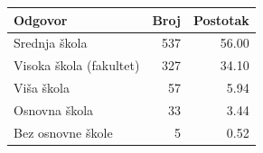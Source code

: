 \begin{tabular}{lrr}
\toprule
Odgovor & Broj & Postotak \\
\midrule
Srednja škola & 537 & 56.00 \\
Visoka škola (fakultet) & 327 & 34.10 \\
Viša škola & 57 & 5.94 \\
Osnovna škola & 33 & 3.44 \\
Bez osnovne škole & 5 & 0.52 \\
\bottomrule
\end{tabular}
